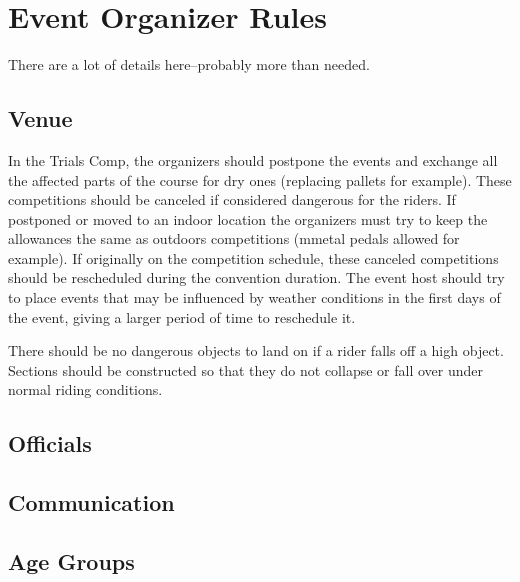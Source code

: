 \chapter{Event Organizer Rules}

\begin{framed}
There are a lot of details here--probably more than needed.
\end{framed}

\section{Venue}

In the Trials Comp, the organizers should postpone the events and exchange all the affected parts of the course for dry ones (replacing pallets for example).
These competitions should be canceled if considered dangerous for the riders.
If postponed or moved to an indoor location the organizers must try to keep the allowances the same as outdoors competitions (mmetal pedals allowed for example).
If originally on the competition schedule, these canceled competitions should be rescheduled during the convention duration.
The event host should try to place events that may be influenced by weather conditions in the first days of the event, giving a larger period of time to reschedule it.

There should be no dangerous objects to land on if a rider falls off a high object.
Sections should be constructed so that they do not collapse or fall over under normal riding conditions.

\section{Officials}


\section{Communication}

\section{Age Groups}

